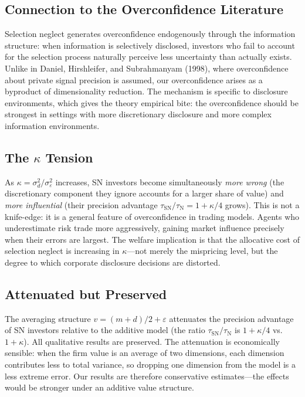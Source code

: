 \documentclass[12pt]{article}
\theoremstyle{plain}
\theoremstyle{definition}
\newcommand{\SN}{\mathrm{SN}}
\newcommand{\N}{\mathrm{N}}
\begin{document}
\subsection{Connection to the Overconfidence Literature}

Selection neglect generates overconfidence endogenously through the information structure: when information is selectively disclosed, investors who fail to account for the selection process naturally perceive less uncertainty than actually exists. Unlike in Daniel, Hirshleifer, and Subrahmanyam (1998), where overconfidence about private signal precision is assumed, our overconfidence arises as a byproduct of dimensionality reduction. The mechanism is specific to disclosure environments, which gives the theory empirical bite: the overconfidence should be strongest in settings with more discretionary disclosure and more complex information environments.

\subsection{The $\kappa$ Tension}

As $\kappa = \sigma_d^2/\sigma_\varepsilon^2$ increases, SN investors become simultaneously \emph{more wrong} (the discretionary component they ignore accounts for a larger share of value) and \emph{more influential} (their precision advantage $\tau_\SN/\tau_\N = 1 + \kappa/4$ grows). This is not a knife-edge: it is a general feature of overconfidence in trading models. Agents who underestimate risk trade more aggressively, gaining market influence precisely when their errors are largest. The welfare implication is that the allocative cost of selection neglect is increasing in $\kappa$---not merely the mispricing level, but the degree to which corporate disclosure decisions are distorted.

\subsection{Attenuated but Preserved}

The averaging structure $v = (m+d)/2 + \varepsilon$ attenuates the precision advantage of SN investors relative to the additive model (the ratio $\tau_\SN/\tau_\N$ is $1 + \kappa/4$ vs.\ $1 + \kappa$). All qualitative results are preserved. The attenuation is economically sensible: when the firm value is an average of two dimensions, each dimension contributes less to total variance, so dropping one dimension from the model is a less extreme error. Our results are therefore conservative estimates---the effects would be stronger under an additive value structure.
\end{document}
